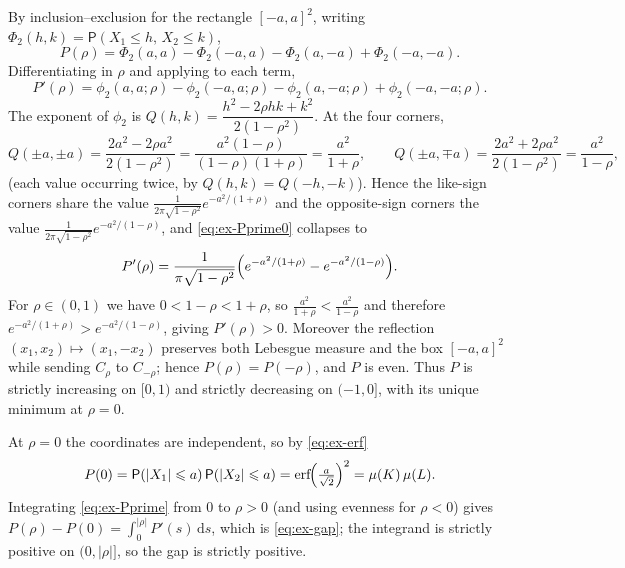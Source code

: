 \documentclass[12pt,a4paper]{article}
\makeatletter
\theoremstyle{definition}
\renewenvironment{proof}[1][\proofname]{\par
  \pushQED{\qed}%
  \normalfont \topsep6\p@\@plus6\p@\relax
  \trivlist
  \item[\hskip\labelsep\bfseries #1\@addpunct{.}]\ignorespaces
}{%
  \popQED\endtrivlist\@endpefalse
}
\newcommand{\PP}{\mathsf{P}}
\newcommand{\dd}{\mathrm{d}}
\newcommand{\erf}{\operatorname{erf}}
\makeatother
\begin{document}
\begin{proof}
  By inclusion--exclusion for the rectangle $[-a,a]^2$, writing
  $\Phi_2(h,k)=\PP(X_1\leqslant h,\,X_2\leqslant k)$,
  \[
    P(\rho)=\Phi_2(a,a)-\Phi_2(-a,a)-\Phi_2(a,-a)+\Phi_2(-a,-a).
  \]
  Differentiating in $\rho$ and applying  to each
  term,
  \begin{equation}\label{eq:ex-Pprime0}
    P'(\rho)=\phi_2(a,a;\rho)-\phi_2(-a,a;\rho)-\phi_2(a,-a;\rho)
      +\phi_2(-a,-a;\rho).
  \end{equation}
  The exponent of $\phi_2$ is
  $Q(h,k)=\dfrac{h^2-2\rho hk+k^2}{2(1-\rho^2)}$.  At the four corners,
  \[
    Q(\pm a,\pm a)=\frac{2a^2-2\rho a^2}{2(1-\rho^2)}
      =\frac{a^2(1-\rho)}{(1-\rho)(1+\rho)}=\frac{a^2}{1+\rho},
    \qquad
    Q(\pm a,\mp a)=\frac{2a^2+2\rho a^2}{2(1-\rho^2)}=\frac{a^2}{1-\rho},
  \]
  (each value occurring twice, by $Q(h,k)=Q(-h,-k)$).  Hence the
  like-sign corners share the value
  $\frac{1}{2\pi\sqrt{1-\rho^2}}e^{-a^2/(1+\rho)}$ and the opposite-sign
  corners the value $\frac{1}{2\pi\sqrt{1-\rho^2}}e^{-a^2/(1-\rho)}$, and
  \eqref{eq:ex-Pprime0} collapses to
  \begin{equation}\label{eq:ex-Pprime}
    P'(\rho)=\frac{1}{\pi\sqrt{1-\rho^2}}
      \Bigl(e^{-a^2/(1+\rho)}-e^{-a^2/(1-\rho)}\Bigr).
  \end{equation}
  For $\rho\in(0,1)$ we have $0<1-\rho<1+\rho$, so
  $\frac{a^2}{1+\rho}<\frac{a^2}{1-\rho}$ and therefore
  $e^{-a^2/(1+\rho)}>e^{-a^2/(1-\rho)}$, giving $P'(\rho)>0$.
  Moreover the reflection $(x_1,x_2)\mapsto(x_1,-x_2)$ preserves both
  Lebesgue measure and the box $[-a,a]^2$ while sending $C_\rho$ to
  $C_{-\rho}$; hence $P(\rho)=P(-\rho)$, and $P$ is even.  Thus $P$ is
  strictly increasing on $[0,1)$ and strictly decreasing on $(-1,0]$,
  with its unique minimum at $\rho=0$.

  At $\rho=0$ the coordinates are independent, so by \eqref{eq:ex-erf}
  \[
    P(0)=\PP(|X_1|\leqslant a)\,\PP(|X_2|\leqslant a)
        =\erf\!\Bigl(\tfrac{a}{\sqrt2}\Bigr)^{2}=\mu(K)\,\mu(L).
  \]
  Integrating \eqref{eq:ex-Pprime} from $0$ to $\rho>0$ (and using
  evenness for $\rho<0$) gives
  $P(\rho)-P(0)=\int_0^{|\rho|}P'(s)\,\dd s$, which is
  \eqref{eq:ex-gap}; the integrand is strictly positive on $(0,|\rho|]$,
  so the gap is strictly positive.
\end{proof}
\end{document}
